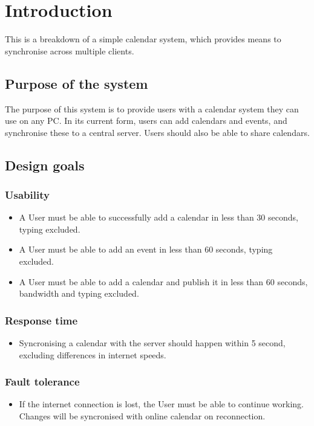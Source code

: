 \documentclass[10pt]{report}
\numberwithin{equation}{section} %
\numberwithin{figure}{section} %
\numberwithin{table}{section} %
\begin{document}
\clearpage
\section{Introduction}
This is a breakdown of a simple calendar system, which provides means to
synchronise across multiple clients.

\subsection{Purpose of the system}
The purpose of this system is to provide users with a calendar system they can
use on any PC. In its current form, users can add calendars and events, and
synchronise these to a central server. Users should also be able to share
calendars.

\subsection{Design goals}
\subsubsection{Usability}
\begin{itemize}
\item A User must be able to successfully add a calendar in less than 30
  seconds, typing excluded.
\item A User must be able to add an event in less than 60 seconds, typing
  excluded.
\item A User must be able to add a calendar and publish it in less than 60
  seconds, bandwidth and typing excluded.
\end{itemize}
\subsubsection{Response time}
\begin{itemize}
\item Syncronising a calendar with the server should happen within 5 second,
  excluding differences in internet speeds.
\end{itemize}
\subsubsection{Fault tolerance}
\begin{itemize}
\item If the internet connection is lost, the User must be able to continue
  working. Changes will be syncronised with online calendar on reconnection.
\end{itemize}
\end{document}
